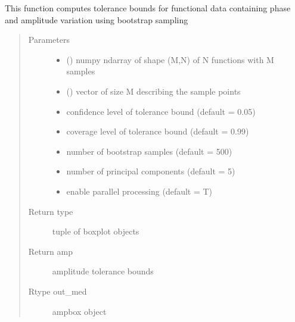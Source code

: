 \documentclass[letterpaper,10pt,english]{sphinxmanual}
\begin{document}
\begin{fulllineitems}
\label{\detokenize{tolerance:tolerance.bootTB}}
This function computes tolerance bounds for functional data containing
phase and amplitude variation using bootstrap sampling
\begin{quote}\begin{description}
\item[{Parameters}] \leavevmode\begin{itemize}
\item {} 
 () \textendash{} numpy ndarray of shape (M,N) of N functions with M samples

\item {} 
 () \textendash{} vector of size M describing the sample points

\item {} 
 \textendash{} confidence level of tolerance bound (default = 0.05)

\item {} 
 \textendash{} coverage level of tolerance bound (default = 0.99)

\item {} 
 \textendash{} number of bootstrap samples (default = 500)

\item {} 
 \textendash{} number of principal components (default = 5)

\item {} 
 \textendash{} enable parallel processing (default = T)

\end{itemize}

\item[{Return type}] \leavevmode
tuple of boxplot objects

\item[{Return amp}] \leavevmode
amplitude tolerance bounds

\item[{Rtype out\_med}] \leavevmode
ampbox object


\end{description}
\end{quote}
\end{fulllineitems}
\end{document}
